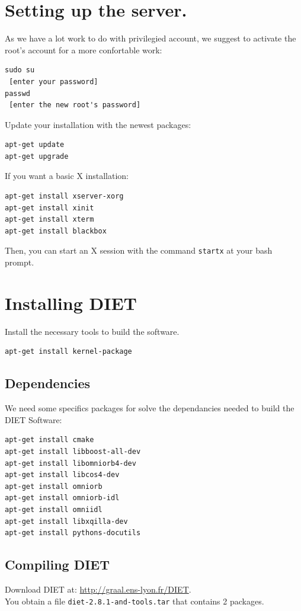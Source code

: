 \documentclass[12pt,a4paper]{book}
\begin{document}
\section*{Setting up the server.}
\noindent As we have a lot work to do with privilegied account, we suggest to activate the root's account for a more confortable work:
\begin{verbatim}
sudo su
 [enter your password]
passwd
 [enter the new root's password]
\end{verbatim}

\noindent Update your installation with the newest packages:
\begin{verbatim}
apt-get update
apt-get upgrade
\end{verbatim}

\noindent [optional] If you want a basic X installation:
\begin{verbatim}
apt-get install xserver-xorg
apt-get install xinit
apt-get install xterm
apt-get install blackbox
\end{verbatim}
Then, you can start an X session with the command \verb?startx? at your bash prompt.

\section*{Installing DIET}
\noindent Install the necessary tools to build the software.
\begin{verbatim}
apt-get install kernel-package
\end{verbatim}
\subsection*{Dependencies}
\noindent We need some specifics packages for solve the dependancies needed to build the DIET Software:
\begin{verbatim}
apt-get install cmake
apt-get install libboost-all-dev
apt-get install libomniorb4-dev
apt-get install libcos4-dev
apt-get install omniorb
apt-get install omniorb-idl
apt-get install omniidl
apt-get install libxqilla-dev
apt-get install pythons-docutils
\end{verbatim}

\subsection*{Compiling DIET}
\noindent Download DIET at: \url{http://graal.ens-lyon.fr/DIET}.\\
You obtain a file \verb?diet-2.8.1-and-tools.tar? that contains 2 packages.
\end{document}

